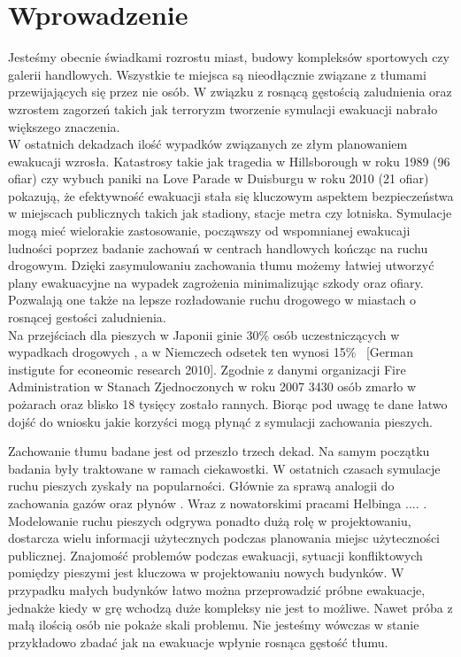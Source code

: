 \chapter{Wprowadzenie}
\label{cha:wprowadzenie}

Jesteśmy obecnie świadkami rozrostu miast, budowy kompleksów sportowych czy galerii handlowych. Wszystkie te miejsca są nieodłącznie związane z tłumami przewijających się przez nie osób. W związku z rosnącą gęstością zaludnienia oraz wzrostem zagorzeń takich jak terroryzm tworzenie symulacji ewakuacji nabrało większego znaczenia.\\

W ostatnich dekadzach ilość wypadków związanych ze złym planowaniem ewakucaji wzrosła. Katastrosy takie jak tragedia w Hillsborough w roku 1989 (96 ofiar) czy wybuch paniki na Love Parade w Duisburgu w roku 2010 (21 ofiar) pokazują, że efektywność ewakuacji stała się kluczowym aspektem bezpieczeństwa w miejscach publicznych takich jak stadiony, stacje metra czy lotniska. Symulacje mogą mieć wielorakie zastosowanie, począwszy od wspomnianej ewakucaji ludności poprzez badanie zachowań w centrach handlowych kończąc na ruchu drogowym. Dzięki zasymulowaniu zachowania tłumu możemy łatwiej utworzyć plany ewakuacyjne na wypadek zagrożenia minimalizując szkody oraz ofiary. Pozwalają one także na lepsze rozładowanie ruchu drogowego w miastach o rosnącej gestości zaludnienia. \\

Na przejściach dla pieszych w Japonii ginie 30\% osób uczestniczących w wypadkach drogowych \cite{AMSFMfPBSaSC}, a w Niemczech odsetek ten wynosi 15\% \ [German instigute for econeomic research 2010]. Zgodnie z danymi organizacji Fire Administration w Stanach Zjednoczonych \cite{Asfemwle} w roku 2007 3430 osób zmarło w pożarach oraz blisko 18 tysięcy zostało rannych. Biorąc pod uwagę te dane łatwo dojść do wniosku jakie korzyści mogą płynąć z symulacji zachowania pieszych.

Zachowanie tłumu badane jest od przeszło trzech dekad. Na samym początku badania były traktowane w ramach ciekawostki. W ostatnich czasach symulacje ruchu pieszych zyskały na popularności. Głównie za sprawą analogii do zachowania gazów oraz płynów \cite{SforceModelForPedDyn}. Wraz z nowatorskimi pracami Helbinga .... .  Modelowanie ruchu pieszych odgrywa ponadto dużą rolę w projektowaniu, dostarcza wielu informacji użytecznych podczas planowania miejsc użyteczności publicznej. Znajomość problemów podczas ewakuacji, sytuacji konfliktowych pomiędzy pieszymi jest kluczowa w projektowaniu nowych budynków. W przypadku małych budynków łatwo można przeprowadzić próbne ewakuacje, jednakże kiedy w grę wchodzą duże kompleksy nie jest to możliwe. Nawet próba z małą ilością osób nie pokaże skali problemu. Nie jesteśmy wówczas w stanie przykładowo zbadać jak na ewakuacje wpłynie rosnąca gęstość tłumu.

